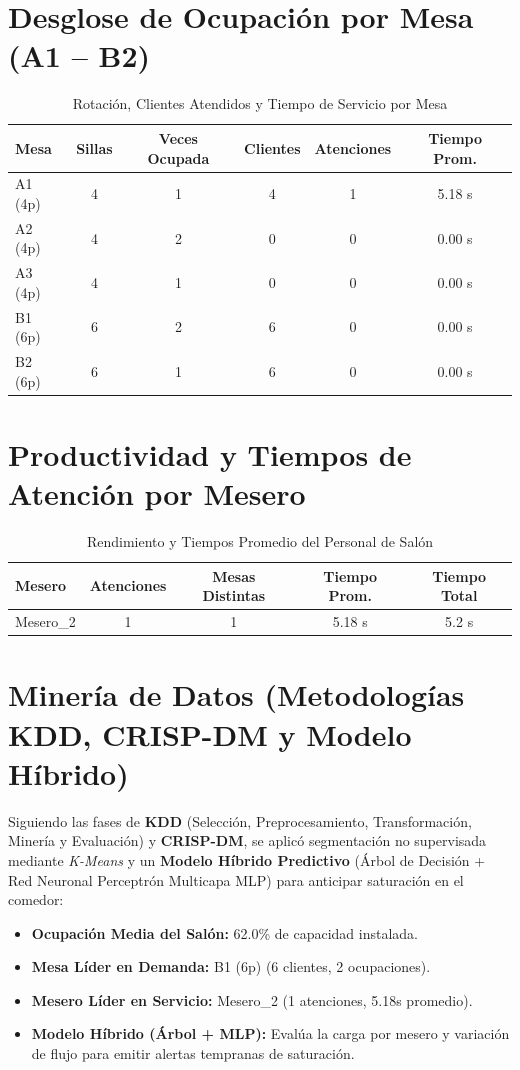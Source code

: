 \documentclass[12pt,a4paper]{article}
\begin{document}
\section{Desglose de Ocupación por Mesa (A1 -- B2)}
\begin{table}[H]
\centering
\caption{Rotación, Clientes Atendidos y Tiempo de Servicio por Mesa}
\begin{tabular}{lccccc}
\toprule
\textbf{Mesa} & \textbf{Sillas} & \textbf{Veces Ocupada} & \textbf{Clientes} & \textbf{Atenciones} & \textbf{Tiempo Prom.} \\
\midrule
A1 (4p) & 4 & 1 & 4 & 1 & 5.18 s \\
A2 (4p) & 4 & 2 & 0 & 0 & 0.00 s \\
A3 (4p) & 4 & 1 & 0 & 0 & 0.00 s \\
B1 (6p) & 6 & 2 & 6 & 0 & 0.00 s \\
B2 (6p) & 6 & 1 & 6 & 0 & 0.00 s \\
\bottomrule
\end{tabular}
\end{table}

\section{Productividad y Tiempos de Atención por Mesero}
\begin{table}[H]
\centering
\caption{Rendimiento y Tiempos Promedio del Personal de Salón}
\begin{tabular}{lcccc}
\toprule
\textbf{Mesero} & \textbf{Atenciones} & \textbf{Mesas Distintas} & \textbf{Tiempo Prom.} & \textbf{Tiempo Total} \\
\midrule
Mesero\_2 & 1 & 1 & 5.18 s & 5.2 s \\
\bottomrule
\end{tabular}
\end{table}

\section{Minería de Datos (Metodologías KDD, CRISP-DM y Modelo Híbrido)}
Siguiendo las fases de \textbf{KDD} (Selección, Preprocesamiento, Transformación, Minería y Evaluación) y \textbf{CRISP-DM}, se aplicó segmentación no supervisada mediante \textit{K-Means} y un \textbf{Modelo Híbrido Predictivo} (Árbol de Decisión + Red Neuronal Perceptrón Multicapa MLP) para anticipar saturación en el comedor:
\begin{itemize}
\item \textbf{Ocupación Media del Salón:} 62.0\% de capacidad instalada.
\item \textbf{Mesa Líder en Demanda:} B1 (6p) (6 clientes, 2 ocupaciones).
\item \textbf{Mesero Líder en Servicio:} Mesero\_2 (1 atenciones, 5.18s promedio).
\item \textbf{Modelo Híbrido (Árbol + MLP):} Evalúa la carga por mesero y variación de flujo para emitir alertas tempranas de saturación.
\end{itemize}
\end{document}
